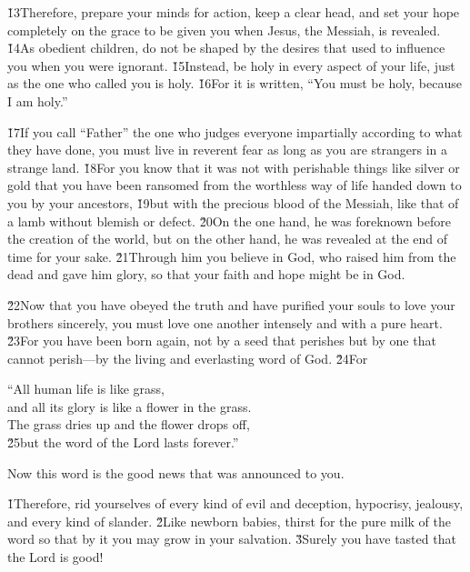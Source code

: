 \v{13}Therefore, prepare your minds for action, keep a clear head, and set your hope completely on the grace to be given you when Jesus, the Messiah, is revealed. \v{14}As obedient children, do not be shaped by the desires that used to influence you when you were ignorant. \v{15}Instead, be holy in every aspect of your life, just as the one who called you is holy. \v{16}For it is written, ``You must be holy, because I am holy.''

\v{17}If you call ``Father'' the one who judges everyone impartially according to what they have done, you must live in reverent fear as long as you are strangers in a strange land. \v{18}For you know that it was not with perishable things like silver or gold that you have been ransomed from the worthless way of life handed down to you by your ancestors, \v{19}but with the precious blood of the Messiah, like that of a lamb without blemish or defect. \v{20}On the one hand, he was foreknown before the creation of the world, but on the other hand, he was revealed at the end of time for your sake. \v{21}Through him you believe in God, who raised him from the dead and gave him glory, so that your faith and hope might be in God.

\v{22}Now that you have obeyed the truth and have purified your souls to love your brothers sincerely, you must love one another intensely and with a pure heart. \v{23}For you have been born again, not by a seed that perishes but by one that cannot perish---by the living and everlasting word of God. \v{24}For

\begin{poetry}
\poeml ``All human life is like grass, \\
\poemll    and all its glory is like a flower in the grass. \\
\poeml The grass dries up and the flower drops off, \\
\poeml \v{25}but the word of the Lord lasts forever.''
\end{poetry}

Now this word is the good news that was announced to you.

\v{1}Therefore, rid yourselves of every kind of evil and deception, hypocrisy, jealousy, and every kind of slander. \v{2}Like newborn babies, thirst for the pure milk of the word so that by it you may grow in your salvation. \v{3}Surely you have tasted that the Lord is good!

